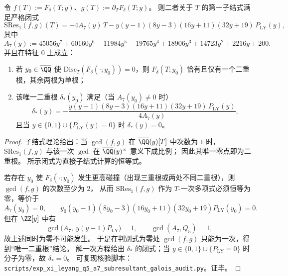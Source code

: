 \begin{theorem}[一阶子结式闭式与唯一二重根刚性]\label{thm:xi-fdelta-subresultant-unique-double-root}
令 \(f(T):=F_\delta(T;y)\)、\(g(T):=\partial_TF_\delta(T;y)\)。
则二者关于 \(T\) 的第一子结式满足严格闭式
\[
\mathrm{SRes}_1(f,g)(T)
=
-4A_7(y)\,T
-y(y-1)(8y-3)(16y+11)(32y+19)\,P_{\mathrm{LY}}(y),
\]
其中
\[
A_7(y):=45056 y^7 + 60160 y^6 - 11984 y^5 - 19765 y^4 + 18906 y^3 + 14723 y^2 + 2216 y + 200.
\]
并且在特征 \(0\) 上成立：
\begin{enumerate}
  \item 若 \(y_0\in\overline{\QQ}\) 使 \(\mathrm{Disc}_T(F_\delta(\cdot;y_0))=0\)，则 \(F_\delta(T;y_0)\) 恰有且仅有一个二重根，其余两根为单根；
  \item 该唯一二重根 \(\delta_\ast(y_0)\) 满足（当 \(A_7(y_0)\neq 0\) 时）
  \[
  \delta_\ast(y)
  =
  -\frac{y(y-1)(8y-3)(16y+11)(32y+19)\,P_{\mathrm{LY}}(y)}{4A_7(y)},
  \]
  且当 \(y\in\{0,1\}\cup\{P_{\mathrm{LY}}(y)=0\}\) 时 \(\delta_\ast(y)=0\)。
\end{enumerate}
\end{theorem}
\begin{proof}
子结式理论给出：当 \(\gcd(f,g)\) 在 \(\overline{\QQ}(y)[T]\) 中次数为 \(1\) 时，
\(\mathrm{SRes}_1(f,g)\) 与该一次 \(\gcd\) 在 \(\overline{\QQ}(y)^\times\) 意义下成比例；
因此其唯一零点即为二重根。
所示闭式为直接子结式计算的恒等式。

若存在 \(y_0\) 使 \(F_\delta(\cdot;y_0)\) 发生更高碰撞（出现三重根或两处不同二重根），则 \(\gcd(f,g)\) 的次数至少为 \(2\)，
从而 \(\mathrm{SRes}_1(f,g)\) 作为 \(T\)-一次多项式必须恒等为零，等价于
\[
A_7(y_0)=0,
\qquad
y_0(y_0-1)(8y_0-3)(16y_0+11)(32y_0+19)P_{\mathrm{LY}}(y_0)=0.
\]
但在 \(\ZZ[y]\) 中有
\[
\gcd\!\bigl(A_7,\ y(y-1)P_{\mathrm{LY}}\bigr)=1,
\qquad
\gcd(A_7,Q_5)=1,
\]
故上述同时为零不可能发生。
于是在判别式为零处 \(\gcd(f,g)\) 只能为一次，得到“唯一二重根”结论。
解一次方程给出 \(\delta_\ast\) 的闭式；当 \(y\in\{0,1\}\cup\{P_{\mathrm{LY}}=0\}\) 时分子为零，故 \(\delta_\ast=0\)。
可复现核验脚本：\texttt{scripts/exp\_xi\_leyang\_q5\_a7\_subresultant\_galois\_audit.py}。证毕。
\end{proof}

